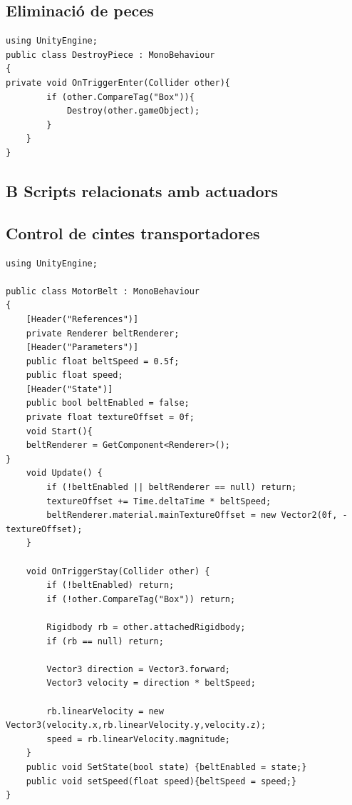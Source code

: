 \documentclass[a4paper,11pt,DIV=13,headings=normal,abstract=true,twoside=semi]{article}
\begin{document}
\subsection*{Eliminació de peces}

\begin{lstlisting}[style=modern, caption={Sistema d'eliminació de peces}, label={lst:destroypiece}]
using UnityEngine;
public class DestroyPiece : MonoBehaviour
{
private void OnTriggerEnter(Collider other){
        if (other.CompareTag("Box")){
            Destroy(other.gameObject);
        }
    }
}

\end{lstlisting}

\subsection*{\textbf{B} Scripts relacionats amb actuadors}

\subsection*{Control de cintes transportadores}

\begin{lstlisting}[style=modern, caption={Controlador de cinta transportadora}, label={lst:motorbelt}]
using UnityEngine;

public class MotorBelt : MonoBehaviour
{
    [Header("References")] 
    private Renderer beltRenderer; 
    [Header("Parameters")]
    public float beltSpeed = 0.5f;
    public float speed;
    [Header("State")]
    public bool beltEnabled = false;  
    private float textureOffset = 0f;
    void Start(){
    beltRenderer = GetComponent<Renderer>();
}
    void Update() {
        if (!beltEnabled || beltRenderer == null) return; 
        textureOffset += Time.deltaTime * beltSpeed; 
        beltRenderer.material.mainTextureOffset = new Vector2(0f, -textureOffset); 
    }

    void OnTriggerStay(Collider other) {
        if (!beltEnabled) return;
        if (!other.CompareTag("Box")) return;

        Rigidbody rb = other.attachedRigidbody; 
        if (rb == null) return;

        Vector3 direction = Vector3.forward; 
        Vector3 velocity = direction * beltSpeed;

        rb.linearVelocity = new Vector3(velocity.x,rb.linearVelocity.y,velocity.z); 
        speed = rb.linearVelocity.magnitude; 
    }
    public void SetState(bool state) {beltEnabled = state;}
    public void setSpeed(float speed){beltSpeed = speed;}   
}

\end{lstlisting}
\end{document}
